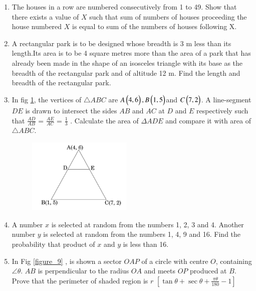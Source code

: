 \documentclass[book,11pt,onecolumn]{IEEEtran}
\begin{document}
\begin{enumerate}
\item The houses in a row are numbered consecutively from 1 to 49. Show that there exists a value of $X$ such that sum of numbers of houses proceeding the house numbered $X$ is equal to sum of the numbers of houses following X.\\

\item A rectangular park is to be designed whose breadth is 3 m less than its length.Its area is to be 4 square metres more than the area of a park that has already been made in the shape of an isosceles triangle with its base as the breadth of the rectangular park and of altitude 12 m. Find the length and breadth of the rectangular park.\\

\item In fig \ref{figure_8}, the vertices of $\triangle ABC$ are $A\begin{pmatrix}4, 6\end{pmatrix}, B\begin{pmatrix}1, 5\end{pmatrix}$and $C\begin{pmatrix}7, 2\end{pmatrix}$. A line-segment $DE$ is drawn to intersect the sides $AB$ and $AC$ at $D$ and $E$ respectively such that $\frac{AD}{AB}$ = $\frac{AE}{AC}$ = $\frac{1}{3}$ . Calculate the area of \( \Delta ADE \) and compare it with area of $ \triangle ABC$.\\
	\begin{figure}[H]
      \centering
      \includegraphics[width=5cm]{figs/8.png}
     \caption{}
      \label{figure_8}
\end{figure} 

\item A number $x$ is selected at random from the numbers 1, 2, 3 and 4. Another number $y$ is selected at random from the numbers 1, 4, 9 and 16. Find the probability that product of $x$ and $y$ is less than 16.\\

\item In Fig  \ref{figure_9} , is shown a sector $OAP$ of a circle with centre $O$, containing $\angle \theta$. $AB$ is perpendicular to the radius $OA$ and meets $OP$ produced at $B$. Prove that the perimeter of shaded region is $r$ $\left[\tan \theta + \sec \theta + \frac{\pi \theta}{180}-1 \right] $ \\


\end{enumerate}
\end{document}
